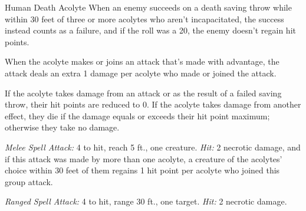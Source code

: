 \documentclass[10pt,a4paper,twoside,bg=print,twocolumn,openany,nodeprecatedcode]{dndbook}
\begin{document}
\begin{DndMonster}[float=t]{Human Death Acolyte}
\DndMonsterBasics[
armor-class = {13 (\textit{leather armor})},
hit-points = {\DndDice{9}},
speed = {30 ft.}
]
\DndMonsterAbilityScores[
 str = 11,
 dex = 14,
 con = 12,
 int = 10,
 wis = 14,
 cha = 14
]
\DndMonsterDetails[
languages = {Common},
challenge = 2,
]
When an enemy succeeds on a death saving throw while within 30 feet of three or more acolytes who aren't incapacitated, the success instead counts as a failure, and if the roll was a 20, the enemy doesn't regain hit points.

When the acolyte makes or joins an attack that's made with advantage, the attack deals an extra 1 damage per acolyte who made or joined the attack.

If the acolyte takes damage from an attack or as the result of a failed saving throw, their hit points are reduced to 0. If the acolyte takes damage from another effect, they die if the damage equals or exceeds their hit point maximum; otherwise they take no damage.

\textsl{Melee Spell Attack:} 4 to hit, reach 5 ft., one creature. \textsl{Hit:} 2 necrotic damage, and if this attack was made by more than one acolyte, a creature of the acolytes' choice within 30 feet of them regains 1 hit point per acolyte who joined this group attack.

\textsl{Ranged Spell Attack:} 4 to hit, range 30 ft., one target. \textsl{Hit:} 2 necrotic damage.

\end{DndMonster}
\end{document}
